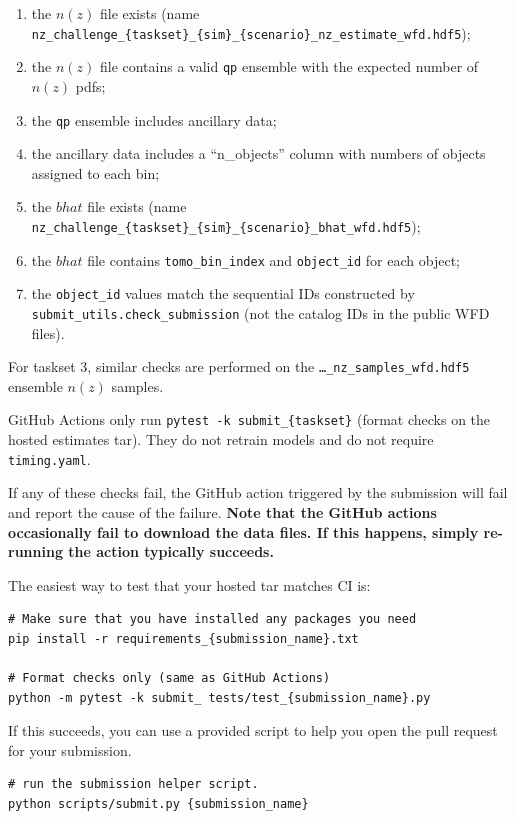 \documentclass[11pt,twoside,letterpaper,onecolumn,english]{article}
\begin{document}
\begin{enumerate}
    \item{the $n(z)$ file exists (name \texttt{nz\_challenge\_\{taskset\}\_\{sim\}\_\{scenario\}\_nz\_estimate\_wfd.hdf5});}
    \item{the $n(z)$ file contains a valid \texttt{qp} ensemble with the expected number of $n(z)$ pdfs;}
    \item{the \texttt{qp} ensemble includes ancillary data;}
    \item{the ancillary data includes a ``n\_objects'' column with numbers of objects assigned to each bin;}
    \item{the $bhat$ file exists (name \texttt{nz\_challenge\_\{taskset\}\_\{sim\}\_\{scenario\}\_bhat\_wfd.hdf5});}
    \item{the $bhat$ file contains \texttt{tomo\_bin\_index} and \texttt{object\_id} for each object;}
    \item{the \texttt{object\_id} values match the sequential IDs constructed by
        \texttt{submit\_utils.check\_submission} (not the catalog IDs in the public WFD files).}
\end{enumerate}

For taskset 3, similar checks are performed on the
\texttt{\ldots\_nz\_samples\_wfd.hdf5} ensemble $n(z)$ samples.

GitHub Actions only run \texttt{pytest -k submit\_\{taskset\}} (format checks on
the hosted estimates tar). They do not retrain models and do not require
\texttt{timing.yaml}.

If any of these checks fail, the GitHub action triggered by the
submission will fail and report the cause of the failure.  \textbf{Note that
the GitHub actions occasionally fail to download the data files.  If this happens,
simply re-running the action typically succeeds.}

The easiest way to test that your hosted tar matches CI is:

\begin{verbatim}
# Make sure that you have installed any packages you need
pip install -r requirements_{submission_name}.txt

# Format checks only (same as GitHub Actions)
python -m pytest -k submit_ tests/test_{submission_name}.py
\end{verbatim}

If this succeeds, you can use a provided script to help you open the
pull request for your submission.

\begin{verbatim}
# run the submission helper script.
python scripts/submit.py {submission_name}
\end{verbatim}
\end{document}

